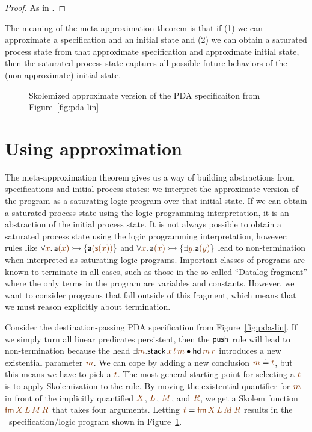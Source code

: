 \begin{proof}
As in \cite[Theorem 3]{simmons11logical}.
\end{proof}

The meaning of the meta-approximation theorem is that if (1) we can
approximate a specification and an initial state and (2) we can obtain
a saturated process state from that approximate specification
and approximate initial state, then the saturated process state captures
all possible future behaviors of the (non-approximate) initial state. 

\begin{figure}
\caption{Skolemized approximate version of the PDA specificaiton from
Figure~\ref{fig:pda-lin}}
\label{fig:pda-pers}
\end{figure}



\section{Using approximation}

The meta-approximation theorem gives us a way of building abstractions
from specifications and initial process states: we interpret the
approximate version of the program as a saturating logic program over
that initial state. If we can obtain a saturated process state using
the logic programming interpretation, it is an abstraction of the
initial process state. It is not always possible to obtain a saturated
process state using the logic programming interpretation, however:
rules like 
$\forall \lf{x}.\,{\sf a}\lf{(x)} \lefti \{ {\sf a}\lf{({\sf s}(x))} \}$ and 
$\forall \lf{x}.\,{\sf
  a}\lf{(x)} \lefti \{ \exists \lf{y}. {\sf a}\lf{(y)} \}$ 
lead to non-termination
when interpreted as saturating logic programs. Important classes 
of programs are known to terminate in all cases, such as those in the
so-called ``Datalog fragment'' where the only terms in the program
are variables and constants. However, we want to consider programs
that fall outside of this fragment, which means that we must 
reason explicitly about termination.

Consider the destination-passing PDA specification from
Figure~\ref{fig:pda-lin}. If we simply turn all linear predicates
persistent, then the ${\sf push}$ rule will lead to non-termination
because the head $\exists \lf{m}. {\sf stack}\,\lf{x}\,\lf{l}\,\lf{m} \fuse {\sf
  hd}\,\lf{m}\,\lf{r}$ introduces a new existential parameter $\lf{m}$. 
We can cope
by adding a new conclusion $\lf{m} \doteq \lf{t}$, but this means we 
have to pick a $\lf{t}$.
The most general starting point for selecting a $\lf{t}$ is to apply
Skolemization to the rule. By moving the existential quantifier for
$\lf{m}$ in front of the implicitly quantified $\lf{X}$, $\lf{L}$, $\lf{M}$, 
and $\lf{R}$, we
get a Skolem function $\lf{{\sf fm}\,X\,L\,M\,R}$ that takes four
arguments. Letting $\lf{t} = \lf{{\sf fm}\,X\,L\,M\,R}$ results in the
\sls~specification/logic program shown in
Figure~\ref{fig:pda-pers}.

